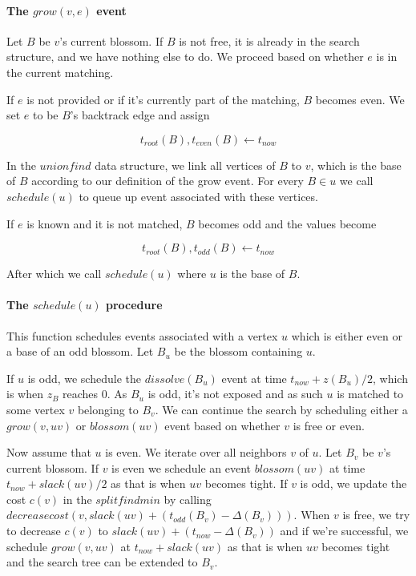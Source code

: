 \paragraph*{The $grow(v, e)$ event}

Let $B$ be $v$'s current blossom. If $B$ is not free, it is already in the search structure, and we have nothing else to do. We proceed based on whether $e$ is in the current matching.

If $e$ is not provided or if it's currently part of the matching, $B$ becomes even. We set $e$ to be $B$'s backtrack edge and assign

\[ t_{root}(B), t_{even}(B) \gets t_{now} \]

In the $unionfind$ data structure, we link all vertices of $B$ to $v$, which is the base of $B$ according to our definition of the grow event. For every $B \in u$ we call $schedule(u)$ to queue up event associated with these vertices.

If $e$ is known and it is not matched, $B$ becomes odd and the values become

\[ t_{root}(B), t_{odd}(B) \gets t_{now} \]

After which we call $schedule(u)$ where $u$ is the base of $B$. 

\paragraph*{The $schedule(u)$ procedure}

This function schedules events associated with a vertex $u$ which is either even or a base of an odd blossom. Let $B_u$ be the blossom containing $u$. 

If $u$ is odd, we schedule the $dissolve(B_u)$ event at time $t_{now} + z(B_u) / 2$, which is when $z_B$ reaches $0$. As $B_u$ is odd, it's not exposed and as such $u$ is matched to some vertex $v$ belonging to $B_v$. We can continue the search by scheduling either a $grow(v, uv)$ or $blossom(uv)$ event based on whether $v$ is free or even.

Now assume that $u$ is even. We iterate over all neighbors $v$ of $u$. Let $B_v$ be $v$'s current blossom. If $v$ is even we schedule an event $blossom(uv)$ at time $t_{now} + slack(uv)/2$ as that is when $uv$ becomes tight. If $v$ is odd, we update the cost $c(v)$ in the $splitfindmin$ by calling $decreasecost(v, slack(uv) + (t_{odd}(B_v) - \Delta(B_v)))$. When $v$ is free, we try to decrease $c(v)$ to $slack(uv) + (t_{now} - \Delta(B_v))$ and if we're successful, we schedule $grow(v, uv)$ at $t_{now} + slack(uv)$ as that is when $uv$ becomes tight and the search tree can be extended to $B_v$.

